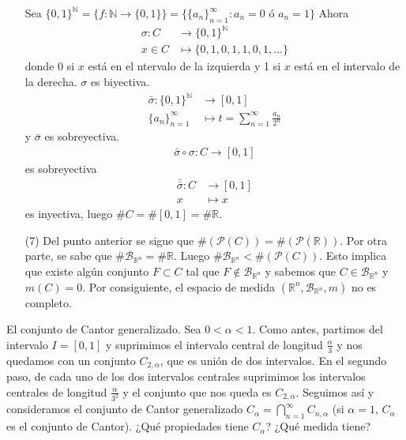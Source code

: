 \begin{enumerate}
          Sea $\{ 0,1 \}^{\mathbb{N}} = \{ f: \mathbb{N} \longrightarrow \{0,1\}\} = \{ \{a_n\}_{n=1}^{\infty} : a_n = 0 \text{ ó } a_n = 1\}$
          Ahora
          \begin{align*}
              \sigma: C & \longrightarrow \{ 0,1 \}^{\mathbb{N}} \\
              x \in C   & \longmapsto \{ 0,1,0,1,1,0,1,...\}
          \end{align*}
          donde 0 si $x$ está en el ntervalo de la izquierda y 1 si $x$ está en el intervalo de la derecha. $\sigma$ es  biyectiva.
          \begin{align*}
              \bar{\sigma}: \{ 0,1 \}^{\mathbb{N}} & \longrightarrow [0,1]                              \\
              \{a_n\}_{n=1}^{\infty}               & \longmapsto t = \sum_{n=1}^{\infty}\frac{a_n}{2^n}
          \end{align*}
          y $\bar{\sigma}$ es sobreyectiva.
          \begin{align*}
              \bar{\sigma} \circ{} \sigma: C \longrightarrow [0,1]
          \end{align*}
          es sobreyectiva
          \begin{align*}
              \bar{\bar{\sigma}}: C & \longrightarrow [0,1] \\
              x                     & \longmapsto x
          \end{align*}
          es inyectiva, luego $\#C = \#[0,1] = \#\mathbb{R}$.
    \item[(7)] Del punto anterior se sigue que $\#(\mathcal{P}(C)) = \#(\mathcal{P}(\mathbb{R}))$. Por otra parte, se sabe que $\#\mathcal{B}_{\mathbb{R}^n} = \#\mathbb{R}$. Luego $\#\mathcal{B}_{\mathbb{R}^n} < \#(\mathcal{P}(C))$. Esto implica que existe algún conjunto $F \subset C$ tal que $F \not \in \mathcal{B}_{\mathbb{R}^n}$ y sabemos que $C \in \mathcal{B}_{\mathbb{R}^n}$ y $m(C) = 0$. Por consiguiente, el espacio de medida $(\mathbb{R}^n, \mathcal{B}_{\mathbb{R}^n}, m)$ no es completo.
\end{enumerate}

\begin{ejemplo}
    El conjunto de Cantor generalizado. Sea $0 < \alpha < 1$. Como antes, partimos del intervalo $I = [0, 1]$ y suprimimos el intervalo central de longitud $\frac{\alpha}{3}$ y nos quedamos con un conjunto $C_{2,\alpha}$, que es unión de dos intervalos. En el segundo paso, de cada uno de los dos intervalos centrales suprimimos los intervalos centrales de longitud $\frac{\alpha}{3^2}$ y el conjunto que nos queda es $C_{2,\alpha}$. Seguimos así y consideramos el conjunto de Cantor generalizado $C_{\alpha} = \bigcap_{n=1}^{\infty}{C_{n,\alpha}}$ (si $\alpha = 1$, $C_{\alpha}$ es el conjunto de Cantor). ¿Qué propiedades tiene $C_{\alpha}$? ¿Qué medida tiene?
\end{ejemplo}

